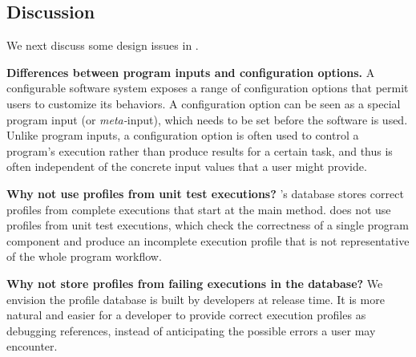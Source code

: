 \subsection{Discussion}





We next discuss some design issues in \ourtool.


\vspace{1mm}
\noindent \textbf{Differences between program inputs and configuration options.}
A configurable software system exposes a range of configuration
options that permit users to
customize its behaviors. %
A configuration option can be seen as a special program input
(or \textit{meta-}input), which needs to be set before the
software is used. Unlike program inputs, a configuration option is often
used to control a program's execution rather than
produce results for a certain task, and thus
is often independent of the concrete input values that a user might provide.


\vspace{1mm}
\noindent \textbf{Why not use profiles from unit test executions?}
\ourtool's database stores correct profiles from complete 
executions that start at the main method.
\ourtool does not use profiles from unit test executions, which check the
correctness
of a single program component and produce
an incomplete execution profile that is not representative of
the whole program workflow. 



\vspace{1mm}
\noindent \textbf{Why not store profiles from failing executions in the database?}
We envision the profile database is built by developers at release time.
It is more natural and easier for a developer to provide correct execution
profiles as debugging references, instead of
anticipating the possible errors a user may encounter.

